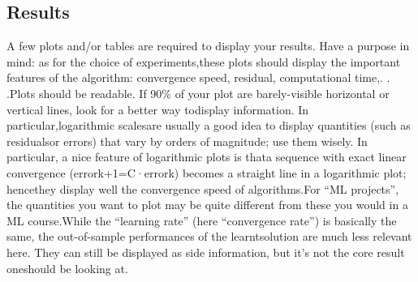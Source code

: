 \subsection{Results}
A few plots and/or tables are required to display your results. Have a purpose in mind: as for the choice of experiments,these plots should display the important features of the algorithm: convergence speed, residual, computational time,. . .Plots should be readable. If 90\% of your plot are barely-visible horizontal or vertical lines, look for a better way todisplay information. In particular,logarithmic scalesare usually a good idea to display quantities (such as residualsor errors) that vary by orders of magnitude; use them wisely. In particular, a nice feature of logarithmic plots is thata sequence with exact linear convergence (errork+1=C·errork) becomes a straight line in a logarithmic plot; hencethey display well the convergence speed of algorithms.For “ML projects”, the quantities you want to plot may be quite different from these you would in a ML course.While the “learning rate” (here “convergence rate”) is basically the same, the out-of-sample performances of the learntsolution are much less relevant here. They can still be displayed as side information, but it’s not the core result oneshould be looking at.